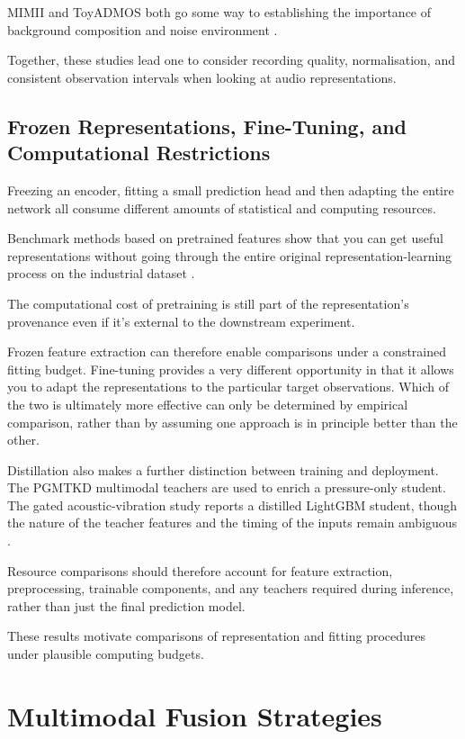 MIMII and ToyADMOS both go some way to establishing the importance of background composition and
noise environment \parencite{Purohit2019MIMII,Koizumi2019ToyADMOS}.

Together, these studies lead one to consider recording quality, normalisation, and consistent
observation intervals when looking at audio representations.

\subsection{Frozen Representations, Fine-Tuning, and Computational Restrictions}

Freezing an encoder, fitting a small prediction head and then adapting the entire network all
consume different amounts of statistical and computing resources.

Benchmark methods based on pretrained features show that you can get useful representations without
going through the entire original representation-learning process on the industrial dataset
\parencite{Roth2022Towards,Costanzino2024Multimodal}.

The computational cost of pretraining is still part of the representation's provenance even if it's
external to the downstream experiment.

Frozen feature extraction can therefore enable comparisons under a constrained fitting budget.
Fine-tuning provides a very different opportunity in that it allows you to adapt the representations
to the particular target observations. Which of the two is ultimately more effective can only be
determined by empirical comparison, rather than by assuming one approach is in principle better than
the other.

Distillation also makes a further distinction between training and deployment. The PGMTKD multimodal
teachers are used to enrich a pressure-only student. The gated acoustic-vibration study reports a
distilled LightGBM student, though the nature of the teacher features and the timing of the inputs
remain ambiguous \parencite{Li2025PGMTKD,Huang2026Rolling}.

Resource comparisons should therefore account for feature extraction, preprocessing, trainable
components, and any teachers required during inference, rather than just the final prediction model.

These results motivate comparisons of representation and fitting procedures under plausible computing budgets.

\section{Multimodal Fusion Strategies}

